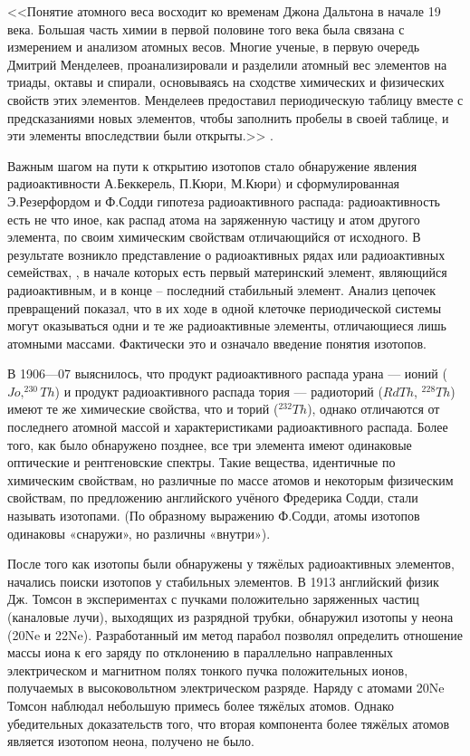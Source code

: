 \documentclass[a5paper,openany]{book}
\begin{document}
		<<Понятие атомного веса восходит ко временам Джона Дальтона в начале 19 века. Большая часть химии в первой половине того века была связана с измерением и анализом атомных весов. Многие ученые, в первую очередь Дмитрий Менделеев, проанализировали и разделили атомный вес элементов на триады, октавы и спирали, основываясь на сходстве химических и физических свойств этих элементов. Менделеев предоставил периодическую таблицу вместе с предсказаниями новых элементов, чтобы заполнить пробелы в своей таблице, и эти элементы впоследствии были открыты.>>  \cite{IUPACIntervalHistory}.  
		
		Важным шагом на пути к открытию изотопов стало обнаружение явления радиоактивности
		А.Беккерель, П.Кюри, М.Кюри) и сформулированная Э.Резерфордом и Ф.Содди 
		гипотеза радиоактивного распада: радиоактивность есть не что иное, как распад атома на заряженную
		частицу и атом другого элемента, по своим химическим свойствам отличающийся от исходного. В
		результате возникло представление о радиоактивных рядах или радиоактивных семействах, , 
		в начале
		которых есть первый материнский элемент, являющийся радиоактивным, и в конце – последний
		стабильный элемент. Анализ цепочек превращений показал, что в их ходе в одной клеточке
		периодической системы могут оказываться одни и те же радиоактивные элементы, отличающиеся лишь
		атомными массами. Фактически это и означало введение понятия изотопов. 
		
		В 1906—07 выяснилось, что продукт радиоактивного распада урана — ионий ($Jo, ^{230}Th$) и
		продукт радиоактивного распада тория — радиоторий ($RdTh$, $^{228}Th$) имеют те же химические свойства,
		что и торий ($^{232}Th$), однако отличаются от последнего атомной массой и характеристиками
		радиоактивного распада. Более того, как было обнаружено позднее, все три элемента имеют
		одинаковые оптические и рентгеновские спектры. Такие вещества, идентичные по химическим
		свойствам, но различные по массе атомов и некоторым физическим свойствам, по предложению
		английского учёного Фредерика Содди, стали называть изотопами. (По образному выражению
		Ф.Содди, атомы изотопов одинаковы «снаружи», но различны «внутри»). 
		
		После того как изотопы были обнаружены у тяжёлых радиоактивных элементов, начались поиски
		изотопов у стабильных элементов. В 1913 английский физик Дж. Томсон в экспериментах с пучками
		положительно заряженных частиц (каналовые лучи), выходящих из разрядной трубки, обнаружил
		изотопы у неона (20Ne и 22Ne). Разработанный им метод парабол позволял определить отношение массы
		иона к его заряду по отклонению в параллельно направленных электрическом и магнитном полях
		тонкого пучка положительных ионов, получаемых в высоковольтном электрическом разряде. Наряду с
		атомами 20Ne Томсон наблюдал небольшую примесь более тяжёлых атомов. Однако убедительных
		доказательств того, что вторая компонента более тяжёлых атомов является изотопом неона, получено не
		было. 
		
\end{document}
